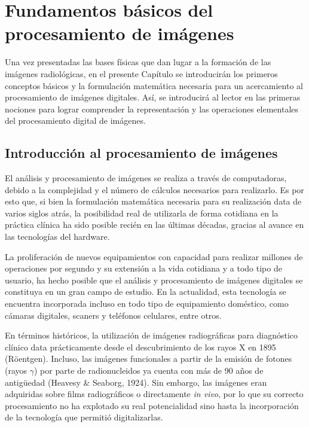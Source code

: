 \chapter{Fundamentos b\'asicos del procesamiento de im\'agenes}

Una vez presentadas las bases físicas que dan lugar a la formación de las imágenes radiológicas, en el presente Capítulo se introducirán los primeros conceptos básicos y la formulación matemática necesaria para un acercamiento al procesamiento de imágenes digitales. Así, se introducirá al lector en las primeras nociones para lograr comprender la representación y las operaciones elementales del procesamiento digital de imágenes.

\section{Introducción al procesamiento de imágenes}

El análisis y procesamiento de imágenes se realiza a través de computadoras, debido a la complejidad y el número de cálculos necesarios para realizarlo. Es por esto que, si bien la formulación matemática necesaria para su realización data de varios siglos atrás, la posibilidad real de utilizarla de forma cotidiana en la práctica clínica ha sido posible recién en las últimas décadas, gracias al avance en las tecnologías del hardware.

La proliferación de nuevos equipamientos con capacidad para realizar millones de operaciones por segundo y su extensión a la vida cotidiana y a todo tipo de usuario, ha hecho posible que el análisis y procesamiento de imágenes digitales se constituya en un gran campo de estudio. En la actualidad, esta tecnología se encuentra incorporada incluso en todo tipo de equipamiento doméstico, como cámaras digitales, scaners y teléfonos celulares, entre otros.

En términos históricos, la utilización de imágenes radiográficas para diagnóstico clínico data prácticamente desde el descubrimiento de los rayos X en 1895 (Röentgen). Incluso, las imágenes funcionales a partir de la emisión de fotones (rayos $\gamma$) por parte de radionucleidos ya cuenta con más de 90 años de antigüedad (Heavesy \& Seaborg, 1924). Sin embargo, las imágenes eran adquiridas sobre films radiográficos o directamente \emph{in vivo}, por lo que su correcto procesamiento no ha explotado su real potencialidad sino hasta la incorporación de la tecnología que permitió digitalizarlas.

